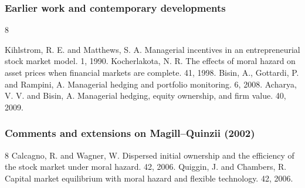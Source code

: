 \documentclass[blue]{beamer}
\theoremstyle{definition}
\theoremstyle{example}
\begin{document}
\begin{frame}\frametitle{Earlier work and contemporary developments}
\begin{thebibliography}{8}
\begin{small}
\beamertemplatearticlebibitems
    Kihlstrom, R. E. and Matthews, S. A.
    \newblock Managerial incentives in an entrepreneurial stock market model.
     1, 1990.
    Kocherlakota, N. R.
    \newblock The effects of moral hazard on asset prices when financial markets are complete.
     41, 1998.
    Bisin, A., Gottardi, P. and Rampini, A.
    \newblock Managerial hedging and portfolio monitoring.
     6, 2008.
    Acharya, V. V. and Bisin, A.
    \newblock Managerial hedging, equity ownership, and firm value.
     40, 2009.
\end{small}
\end{thebibliography}
\end{frame}

\begin{frame}\frametitle{Comments and extensions on Magill--Quinzii (2002)}
\begin{thebibliography}{8}
\beamertemplatearticlebibitems
    Calcagno, R. and Wagner, W.
    \newblock Dispersed initial ownership and the efficiency of the stock market under moral hazard.
     42, 2006.
    Quiggin, J. and Chambers, R.
    \newblock Capital market equilibrium with moral hazard and flexible technology.
     42, 2006.
\end{thebibliography}
\end{frame}
\end{document}
